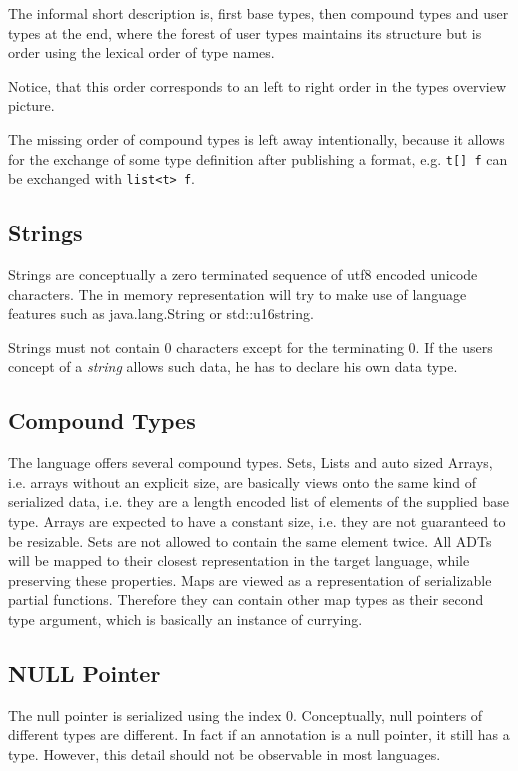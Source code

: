 \documentclass[a4paper,10pt]{article}
\begin{document}
The informal short description is, first base types, then compound types and user types at the end, where the forest of user types maintains its structure but is order using the lexical order of type names.

Notice, that this order corresponds to an left to right order in the types overview picture.

The missing order of compound types is left away intentionally, because it allows for the exchange of some type definition after publishing a format, e.g. \verb/t[] f/ can be exchanged with \verb/list<t> f/.


\subsection*{Strings}

Strings are conceptually a zero terminated sequence of utf8 encoded unicode characters. The in memory representation will try to make use of language features such as java.lang.String or std::u16string.

Strings must not contain 0 characters except for the terminating 0. If the users concept of a \textit{string} allows such data, he has to declare his own data type.

\subsection*{Compound Types}

The language offers several compound types. Sets, Lists and auto sized Arrays, i.e. arrays without an explicit size, are basically views onto the same kind of serialized data, i.e. they are a length encoded list of elements of the supplied base type. Arrays are expected to have a constant size, i.e. they are not guaranteed to be resizable. Sets are not allowed to contain the same element twice.
All ADTs will be mapped to their closest representation in the target language, while preserving these properties.
Maps are viewed as a representation of serializable partial functions. Therefore they can contain other map types as their second type argument, which is basically an instance of currying.

\subsection*{NULL Pointer}

The null pointer is serialized using the index 0. Conceptually, null pointers of different types are different. In fact if an annotation is a null pointer, it still has a type. However, this detail should not be observable in most languages.
\end{document}
